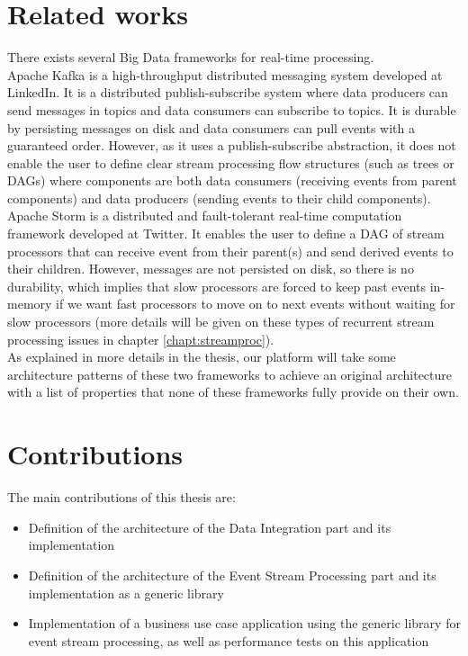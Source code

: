 \section{Related works}

There exists several Big Data frameworks for real-time processing. 
\\

Apache Kafka  is a high-throughput distributed messaging system developed at LinkedIn. It is a distributed publish-subscribe system where data producers can send messages in topics and data consumers can subscribe to topics. It is durable by persisting messages on disk and data consumers can pull events with a guaranteed order. However, as it uses a publish-subscribe abstraction, it does not enable the user to define clear stream processing flow structures (such as trees or DAGs) where components are both data consumers (receiving events from parent components) and data producers (sending events to their child components).
\\

Apache Storm  is a distributed and fault-tolerant real-time computation framework developed at Twitter. It enables the user to define a DAG of stream processors that can receive event from their parent(s) and send derived events to their children. However, messages are not persisted on disk, so there is no durability, which implies that slow processors are forced to keep past events in-memory if we want fast processors to move on to next events without waiting for slow processors (more details will be given on these types of recurrent stream processing issues in chapter \ref{chapt:streamproc}).
\\

As explained in more details in the thesis, our platform will take some architecture patterns of these two frameworks to achieve an original architecture with a list of properties that none of these frameworks fully provide on their own.

\section{Contributions}

The main contributions of this thesis are:
\begin{itemize}
  \item Definition of the architecture of the Data Integration part and its implementation
  \item Definition of the architecture of the Event Stream Processing part and its implementation as a generic library
  \item Implementation of a business use case application using the generic library for event stream processing, as well as performance tests on this application
\end{itemize}




